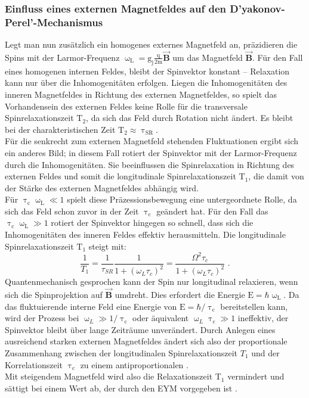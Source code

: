 \subsubsection{Einfluss eines externen Magnetfeldes auf den D'yakonov-Perel'-Mechanismus}
\label{DPM_Mag}
Legt man nun zusätzlich ein homogenes externes Magnetfeld an, präzidieren die Spins mit der Larmor-Frequenz $\upomega_\text{L}=\text{g}_\text{j}\frac{\text{q}}{\text{2m}}\vec{\textbf{B}}$ um das Magnetfeld $\vec{\textbf{B}}$. Für den Fall eines homogenen internen Feldes, bleibt der Spinvektor konstant – Relaxation kann nur über die Inhomogenitäten erfolgen. Liegen die Inhomogenitäten des inneren Magnetfeldes in Richtung des externen Magnetfeldes, so spielt das Vorhandensein des externen Feldes keine Rolle für die transversale Spinrelaxationszeit $\text{T}_\text{2}$, da sich das Feld durch Rotation nicht ändert. Es bleibt bei der charakteristischen Zeit $\text{T}_\text{2} \approx \uptau_\text{SR}$.\\ 
Für die senkrecht zum externen Magnetfeld stehenden Fluktuationen ergibt sich ein anderes Bild; in diesem Fall rotiert der Spinvektor mit der Larmor-Frequenz durch die Inhomogenitäten. Sie beeinflussen die Spinrelaxation in Richtung des externen Feldes und somit die longitudinale Spinrelaxationszeit $\text{T}_\text{1}$, die damit von der Stärke des externen Magnetfeldes abhängig wird.\\
Für $\uptau_\text{c}\upomega_\text{L} \ll \text{1}$ spielt diese Präzessionsbewegung eine untergeordnete Rolle, da sich das Feld schon zuvor in der Zeit $\uptau_\text{c}$ geändert hat. Für den Fall das $\uptau_\text{c} \upomega_\text{L} \gg \text{1}$ rotiert der Spinvektor hingegen so schnell, dass sich die Inhomogenitäten des inneren Feldes effektiv herausmitteln. Die longitudinale Spinrelaxationszeit $\text{T}_\text{1}$ steigt mit:
\begin{equation}
\frac{1}{T_1}=\frac{1}{\tau_{SR}}\frac{1}{1+(\omega_L \tau_{c})^2}=\frac{\Omega^2 \tau_c}{1+(\omega_L \tau_{c})^2} \text{ .}
\end{equation}
Quantenmechanisch gesprochen kann der Spin nur longitudinal relaxieren, wenn sich die Spinprojektion auf $\vec{\textbf{B}}$  umdreht. Dies erfordert die Energie $\text{E}=\hbar\upomega_\text{L}$. Da das fluktuierende interne Feld eine Energie von $\text{E}=\hbar/\uptau_\text{c}$ bereitstellen kann, wird der Prozess bei $\upomega_{L}\gg\text{1}/\uptau_\text{c}$ oder äquivalent $\upomega_{L}\uptau_\text{c}\gg\text{1}$ ineffektiv, der Spinvektor bleibt über lange Zeiträume unverändert. Durch Anlegen eines ausreichend starken externen Magnetfeldes ändert sich also der proportionale Zusammenhang zwischen der longitudinalen Spinrelaxationszeit $T_\text{1}$ und der Korrelationszeit $\uptau_\text{c}$ zu einem antiproportionalen \cite{Dyakonov.2008}.\\
Mit steigendem Magnetfeld wird also die Relaxationszeit T$_\text{1}$ vermindert und sättigt bei einem Wert ab, der durch den EYM vorgegeben ist \cite{Bronold.2002}.
